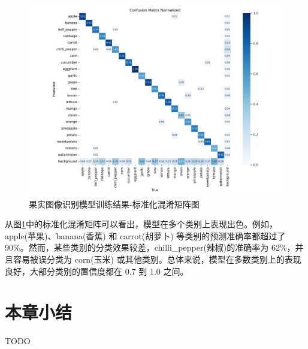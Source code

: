\begin{figure}[H]
    \centering
    \includegraphics[width=0.8\linewidth]{../source/aws-img/yolov8/out/image/confusion_matrix_normalized.png}
    \caption{果实图像识别模型训练结果-标准化混淆矩阵图}
    \label{fig:confusion_matrix_normalized}
\end{figure}

从图\ref{fig:confusion_matrix_normalized}中的标准化混淆矩阵可以看出，模型在多个类别上表现出色。例如，apple(苹果)、banana(香蕉) 和 carrot(胡萝卜) 等类别的预测准确率都超过了 90\%。然而，某些类别的分类效果较差，chilli\_pepper(辣椒)的准确率为 62\%，并且容易被误分类为 corn(玉米) 或其他类别。总体来说，模型在多数类别上的表现良好，大部分类别的置信度都在 0.7 到 1.0 之间。

\section{本章小结}

TODO